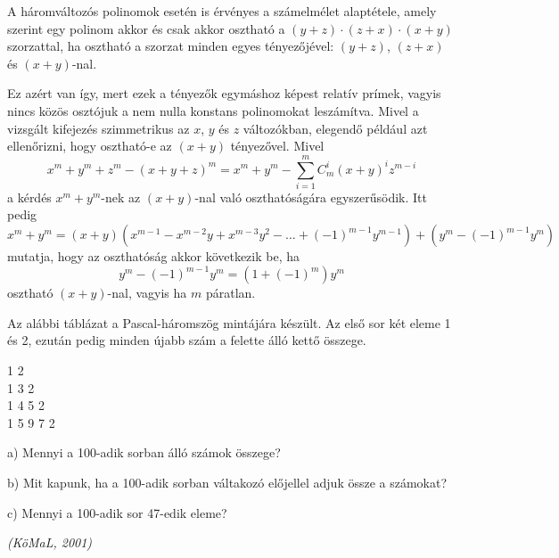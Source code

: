 \begin{solution}
A háromváltozós polinomok esetén is érvényes a számelmélet alaptétele,
amely szerint egy polinom akkor és csak akkor osztható a $(y+z)\cdot(z+x)\cdot(x+y)$
szorzattal, ha osztható a szorzat minden egyes tényezőjével: $(y+z)$,
$(z+x)$ és $(x+y)$-nal.

Ez azért van így, mert ezek a tényezők egymáshoz képest relatív prímek,
vagyis nincs közös osztójuk a nem nulla konstans polinomokat leszámítva.
Mivel a vizsgált kifejezés szimmetrikus az $x$, $y$ és $z$ változókban,
elegendő például azt ellenőrizni, hogy osztható-e az $(x+y)$ tényezővel.
Mivel 
\[
x^{m}+y^{m}+z^{m}-(x+y+z)^{m}=x^{m}+y^{m}-\sum_{i=1}^{m}C_{m}^{i}(x+y)^{i}z^{m-i}
\]
a kérdés $x^{m}+y^{m}$-nek az $(x+y)$-nal való oszthatóságára egyszerűsödik.
Itt pedig 
\[
x^{m}+y^{m}=(x+y)(x^{m-1}-x^{m-2}y+x^{m-3}y^{2}-\dots+(-1)^{m-1}y^{m-1})+(y^{m}-(-1)^{m-1}y^{m})
\]
mutatja, hogy az oszthatóság akkor következik be, ha 
\[
y^{m}-(-1)^{m-1}y^{m}=(1+(-1)^{m})y^{m}
\]
osztható $(x+y)$-nal, vagyis ha $m$ páratlan. 
\end{solution}
\begin{extraproblem}
Az alábbi táblázat a Pascal-háromszög mintájára készült. Az első
sor két eleme 1 és 2, ezután pedig minden újabb szám a felette álló
kettő összege.
\begin{center}
1 \quad{}2 \\
 1 \quad{}3 \quad{}2 \\
 1 \quad{}4 \quad{}5 \quad{}2 \\
 1 \quad{}5 \quad{}9 \quad{}7 \quad{}2 
\par\end{center}
a) Mennyi a 100-adik sorban álló számok összege?

b) Mit kapunk, ha a 100-adik sorban váltakozó előjellel adjuk össze
a számokat?

c) Mennyi a 100-adik sor 47-edik eleme?

\emph{(KöMaL, 2001) }
\end{extraproblem}

